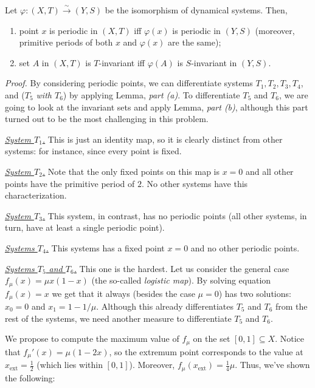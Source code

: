 \documentclass{template}
\begin{document}
\begin{lemma}
    Let $\varphi: (X,T) \xrightarrow{\sim} (Y,S)$ be the isomorphism of dynamical 
    systems. Then,
    \begin{enumerate}
        \item[(a)] point $x$ is periodic in $(X,T)$ iff $\varphi(x)$ is periodic
        in $(Y,S)$ (moreover, primitive periods of both $x$ and $\varphi(x)$ are the same);
        \item[(b)] set $A$ in $(X,T)$ is $T$-invariant iff $\varphi(A)$ is
        $S$-invariant in $(Y,S)$.
    \end{enumerate}
\end{lemma}

\textit{Proof.} By considering periodic points, we can differentiate systems
$T_1,T_2,T_3,T_4$, and (\textit{$T_5$ with $T_6$}) by applying Lemma,
\textit{part (a)}. To differentiate $T_5$ and $T_6$, we are going to look at the
invariant sets and apply Lemma, \textit{part (b)}, although this part 
turned out to be the most challenging in this problem.

\underline{\textit{System $T_1$.}} This is just an identity map, so it is
clearly distinct from other systems: for instance, since every point is fixed.

\underline{\textit{System $T_2$.}} Note that the only fixed points on this map 
is $x=0$ and all other points have the primitive period of $2$. No other 
systems have this characterization.

\underline{\textit{System $T_3$.}} This system, in contrast, has no periodic 
points (all other systems, in turn, have at least a single periodic point).

\underline{\textit{Systems $T_4$.}} This systems has a fixed point $x=0$ and no
other periodic points.

\underline{\textit{Systems $T_5$ and $T_6$.}} This one is the hardest. Let us
consider the general case $f_{\mu}(x) = \mu x(1-x)$ (the so-called
\textit{logistic map}). By solving equation $f_{\mu}(x)=x$ we get that it always
(besides the case $\mu=0$) has two solutions: $x_0=0$ and $x_1=1-1/\mu$.
Although this already differentiates $T_5$ and $T_6$ from the rest of the
systems, we need another measure to differentiate $T_5$ and $T_6$.

We propose to compute the maximum value of $f_{\mu}$ on the set $[0,1] \subseteq
X$. Notice that $f_{\mu}'(x) = \mu(1-2x)$, so the extremum point corresponds to
the value at $x_{\text{ext}} = \frac{1}{2}$ (which lies within $[0,1]$).
Moreover, $f_{\mu}(x_{\text{ext}}) = \frac{1}{4}\mu$. Thus, we've shown the following:
\end{document}
